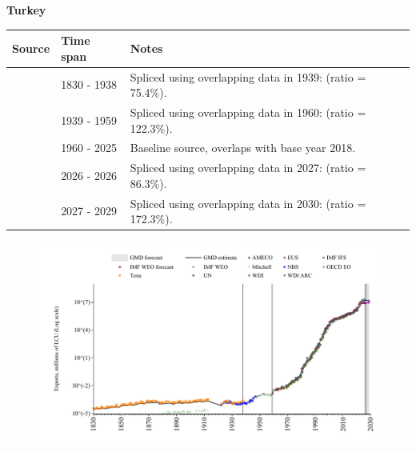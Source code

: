 \documentclass[12pt,a4paper,landscape]{article}
\begin{document}
\begin{adjustbox}{max totalsize={\paperwidth}{\paperheight},center}
\begin{minipage}[t][\textheight][t]{\textwidth}
\vspace*{0.5cm}
{}
\begin{center}
{\Large\bfseries Turkey}
\end{center}
\vspace{0.5cm}
\begin{table}[H]
\centering
\small
\begin{tabular}{|l|l|l|}
\hline
\textbf{Source} & \textbf{Time span} & \textbf{Notes} \\
\hline
\rowcolor{white}\cite{Tena}& 1830 - 1938 &Spliced using overlapping data in 1939: (ratio = 75.4\%).\\
\rowcolor{lightgray}\cite{Mitchell}& 1939 - 1959 &Spliced using overlapping data in 1960: (ratio = 122.3\%).\\
\rowcolor{white}\cite{OECD_EO}& 1960 - 2025 &Baseline source, overlaps with base year 2018.\\
\rowcolor{lightgray}\cite{AMECO}& 2026 - 2026 &Spliced using overlapping data in 2027: (ratio = 86.3\%).\\
\rowcolor{white}\cite{IMF_WEO_forecast}& 2027 - 2029 &Spliced using overlapping data in 2030: (ratio = 172.3\%).\\
\hline
\end{tabular}
\end{table}
\begin{figure}[H]
\centering
\includegraphics[width=\textwidth,height=0.6\textheight,keepaspectratio]{graphs/TUR_exports.pdf}
\end{figure}
\end{minipage}
\end{adjustbox}
\end{document}
